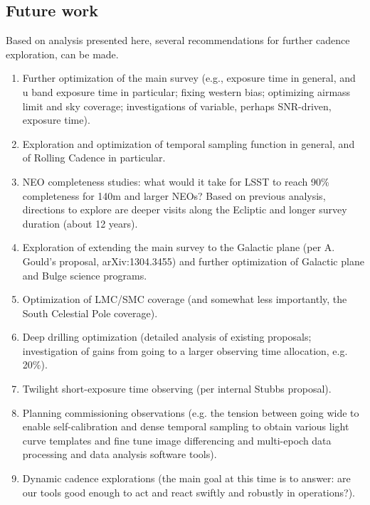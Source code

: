\subsection{Future work}

Based on analysis presented here, several recommendations
for further cadence exploration, can be made.

\begin{enumerate}

\item Further optimization of the main survey (e.g., exposure time in
general, and u band exposure time in particular; fixing western bias;
optimizing airmass limit and sky coverage; investigations of variable,
perhaps SNR-driven, exposure time).

\item Exploration and optimization of temporal sampling function in
general, and of Rolling Cadence in particular.

\item NEO completeness studies: what would it take for LSST to reach
90\% completeness for 140m and larger NEOs?  Based on previous
analysis, directions to explore are deeper visits along the Ecliptic
and longer survey duration (about 12 years).

\item Exploration of extending the main survey to the Galactic plane
(per A. Gould's proposal, arXiv:1304.3455) and further optimization of
Galactic plane and Bulge science programs.

\item Optimization of LMC/SMC coverage (and somewhat less importantly,
the South Celestial Pole coverage).

\item Deep drilling optimization (detailed analysis of existing
proposals; investigation of gains from going to a larger observing
time allocation, e.g. 20\%).

\item Twilight short-exposure time observing (per internal Stubbs proposal).

\item Planning commissioning observations (e.g. the tension between
going wide to enable self-calibration and dense temporal sampling to
obtain various light curve templates and fine tune image differencing
and multi-epoch data processing and data analysis software tools).

\item Dynamic cadence explorations (the main goal at this time is to
answer: are our tools good enough to act and react swiftly and
robustly in operations?).

\end{enumerate}


